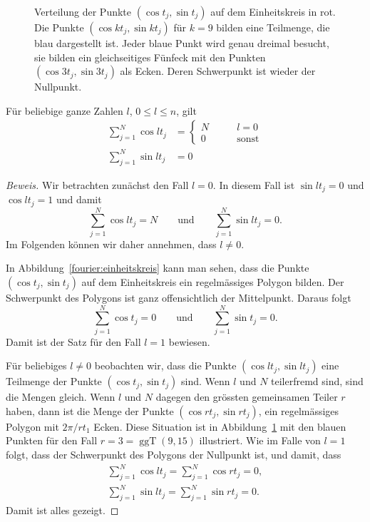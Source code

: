 \begin{figure}
\begin{tikzpicture}[>=latex,thick]
\end{tikzpicture}
\caption{Verteilung der Punkte $(\cos t_j, \sin t_j)$  auf dem Einheitskreis 
in rot.
Die Punkte $(\cos kt_j,\sin kt_j)$ für $k=9$ bilden eine Teilmenge, die
blau dargestellt ist.
Jeder blaue Punkt wird genau dreimal besucht, sie bilden ein gleichseitiges
Fünfeck mit den Punkten $(\cos 3t_j,\sin 3t_j)$ als Ecken.
Deren Schwerpunkt ist wieder der Nullpunkt.
\label{fourier:einheitskreis}
}
\end{figure}

\begin{satz}
Für beliebige ganze Zahlen $l$, $0\le l\le n$, gilt
\begin{equation*}
\begin{aligned}
\sum_{j=1}^N \cos lt_j
&=
\begin{cases}
N&\qquad l=0\\
0&\qquad\text{sonst}
\end{cases}
\\
\sum_{j=1}^N \sin lt_j
&=0
\end{aligned}
\end{equation*}
\end{satz}

\begin{proof}[Beweis]
Wir betrachten zunächst den Fall $l=0$.
In diesem Fall ist $\sin lt_j=0$ und $\cos lt_j=1$ und damit
\[
\sum_{j=1}^N \cos lt_j = N
\qquad\text{und}\qquad
\sum_{j=1}^N \sin lt_j = 0.
\]
Im Folgenden können wir daher annehmen, dass $l\ne 0$.

In Abbildung~\eqref{fourier:einheitskreis} kann man sehen, dass die Punkte
$(\cos t_j,\sin t_j)$ auf dem Einheitskreis ein regelmässiges Polygon
bilden.
Der Schwerpunkt des Polygons ist ganz offensichtlich der Mittelpunkt.
Daraus folgt
\[
\sum_{j=1}^N \cos t_j = 0
\qquad\text{und}\qquad
\sum_{j=1}^N \sin t_j = 0.
\]
Damit ist der Satz für den Fall $l=1$ bewiesen.

Für beliebiges $l\ne 0$ beobachten wir, dass die Punkte 
$(\cos lt_j,\sin lt_j)$ eine Teilmenge der Punkte $(\cos t_j, \sin t_j)$
sind.
Wenn $l$ und $N$ teilerfremd sind, sind die Mengen gleich.
Wenn $l$ und $N$ dagegen den grössten gemeinsamen Teiler $r$ haben, dann
ist die Menge der Punkte $(\cos rt_j,\sin rt_j)$, ein regelmässiges
Polygon mit $2\pi / rt_1$ Ecken.
Diese Situation ist in Abbildung~\ref{fourier:einheitskreis} mit den
blauen Punkten für den Fall $r=3=\operatorname{ggT}(9,15)$
illustriert.
Wie im Falle von $l=1$ folgt, dass der Schwerpunkt des Polygons der
Nullpunkt ist, und damit, dass
\begin{align*}
\sum_{j=1}^N \cos lt_j 
=
\sum_{j=1}^N \cos rt_j 
=
0,
\\
\sum_{j=1}^N \sin lt_j 
=
\sum_{j=1}^N \sin rt_j 
=
0.
\end{align*}
Damit ist alles gezeigt.
\end{proof}

